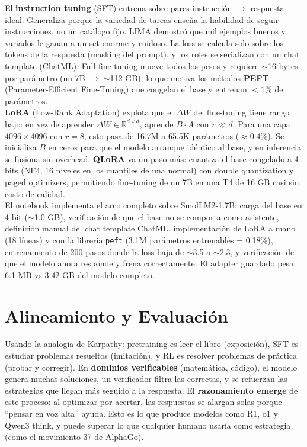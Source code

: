 \documentclass[11pt,a4paper]{article}
\begin{document}
El \textbf{instruction tuning} (SFT) entrena sobre pares instrucci\'on $\to$ respuesta ideal. Generaliza porque la variedad de tareas ense\~na la habilidad de seguir instrucciones, no un cat\'alogo fijo. LIMA demostr\'o que mil ejemplos buenos y variados le ganan a un set enorme y ruidoso. La loss se calcula solo sobre los tokens de la respuesta (masking del prompt), y los roles se serializan con un chat template (ChatML). Full fine-tuning mueve todos los pesos y requiere $\sim$16 bytes por par\'ametro (un 7B $\to$ $\sim$112 GB), lo que motiva los m\'etodos \textbf{PEFT} (Parameter-Efficient Fine-Tuning) que congelan el base y entrenan $<1\%$ de par\'ametros. \\[1ex]

\textbf{LoRA} (Low-Rank Adaptation) explota que el $\Delta W$ del fine-tuning tiene rango bajo: en vez de aprender $\Delta W \in \mathbb{R}^{d \times d}$, aprende $B \cdot A$ con $r \ll d$. Para una capa $4096 \times 4096$ con $r=8$, esto pasa de 16.7M a 65.5K par\'ametros ($\approx 0.4\%$). Se inicializa $B$ en ceros para que el modelo arranque id\'entico al base, y en inferencia se fusiona sin overhead. \textbf{QLoRA} va un paso m\'as: cuantiza el base congelado a 4 bits (NF4, 16 niveles en los cuantiles de una normal) con double quantization y paged optimizers, permitiendo fine-tuning de un 7B en una T4 de 16 GB casi sin costo de calidad. \\[1ex]

El notebook implementa el arco completo sobre SmolLM2-1.7B: carga del base en 4-bit ($\sim$1.0 GB), verificaci\'on de que el base no se comporta como asistente, definici\'on manual del chat template ChatML, implementaci\'on de LoRA a mano (18 l\'ineas) y con la librer\'ia \texttt{peft} (3.1M par\'ametros entrenables = 0.18\%), entrenamiento de 200 pasos donde la loss baja de $\sim$3.5 a $\sim$2.3, y verificaci\'on de que el modelo ahora responde y frena correctamente. El adapter guardado pesa 6.1 MB vs 3.42 GB del modelo completo. \\[1ex]

\section{Alineamiento y Evaluaci\'on}

Usando la analog\'ia de Karpathy: pretraining es leer el libro (exposici\'on), SFT es estudiar problemas resueltos (imitaci\'on), y RL es resolver problemas de pr\'actica (probar y corregir). En \textbf{dominios verificables} (matem\'atica, c\'odigo), el modelo genera muchas soluciones, un verificador filtra las correctas, y se refuerzan las estrategias que llegan m\'as seguido a la respuesta. El \textbf{razonamiento emerge} de este proceso: al optimizar por acertar, las respuestas se alargan solas porque ``pensar en voz alta'' ayuda. Esto es lo que produce modelos como R1, o1 y Qwen3 think, y puede superar lo que cualquier humano usar\'ia como estrategia (como el movimiento 37 de AlphaGo). \\[1ex]
\end{document}
